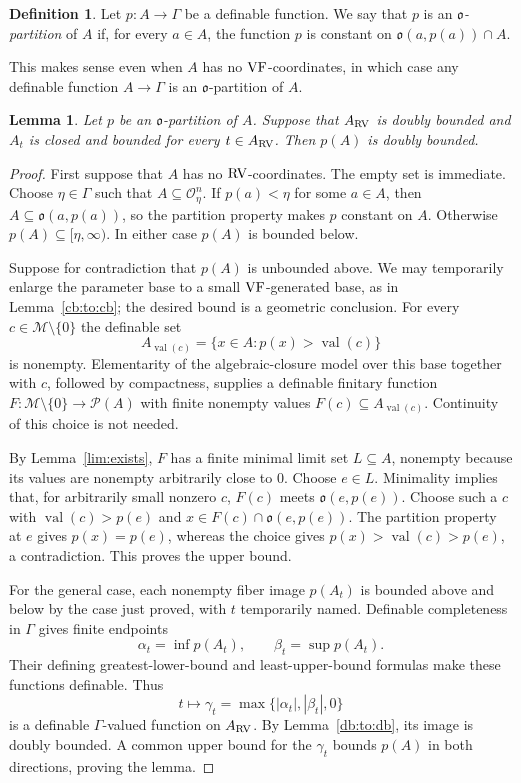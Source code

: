 \documentclass[12pt]{amsart}
\newcommand{\memph}[1]{{\color{magenta}\emph{#1}}}
\theoremstyle{plain}
\newtheorem{lem}[thm]{Lemma}
\theoremstyle{definition}
\newtheorem{defn}[thm]{Definition}
\theoremstyle{remark}
\numberwithin{equation}{section}
\theoremstyle{plain}
\newcommand{\VF}{\textup{VF}}
\newcommand{\RV}{\textup{RV}}
\newcommand{\MM}{\mdl M}
\newcommand{\OO}{\mdl O}
\newcommand{\go}{\mathfrak{o}}
\newcommand{\0}{\emptyset}
\newcommand{\mdl}[1]{\mathcal{#1}}  %
\newcommand{\fun}{\longrightarrow}
\newcommand{\efun}{\longmapsto}
\DeclareMathOperator{\vv}{val}
\begin{document}
\begin{defn}
Let $p : A \fun \Gamma$ be a definable function. We say that $p$ is an \memph{$\go$-partition} of $A$ if, for every $a \in A$, the function $p$ is constant on $\go(a, p(a)) \cap A$.
\end{defn}


This makes sense even when $A$ has no $\VF$-coordinates, in which case any definable function $A \fun \Gamma$ is an $\go$-partition of $A$.

\begin{lem}\label{vol:par:bounded}
Let $p$ be an $\go$-partition of $A$. Suppose that $A_{\RV}$ is doubly bounded and $A_t$ is closed and bounded for every $t \in A_{\RV}$. Then $p(A)$ is doubly bounded.
\end{lem}
\begin{proof}
First suppose that $A$ has no $\RV$-coordinates. The empty set is immediate. Choose $\eta\in\Gamma$ such that $A\subseteq\OO_\eta^n$. If $p(a)<\eta$ for some $a\in A$, then $A\subseteq\go(a,p(a))$, so the partition property makes $p$ constant on $A$. Otherwise $p(A)\subseteq[\eta,\infty)$. In either case $p(A)$ is bounded below.

Suppose for contradiction that $p(A)$ is unbounded above. We may temporarily enlarge the parameter base to a small $\VF$-generated base, as in Lemma~\ref{cb:to:cb}; the desired bound is a geometric conclusion. For every $c\in\MM\setminus\{0\}$ the definable set
\[
A_{\vv(c)}=\{x\in A:p(x)>\vv(c)\}
\]
is nonempty. Elementarity of the algebraic-closure model over this base together with $c$, followed by compactness, supplies a definable finitary function $F:\MM\setminus\{0\}\fun\mdl P(A)$ with finite nonempty values $F(c)\subseteq A_{\vv(c)}$. Continuity of this choice is not needed.

By Lemma~\ref{lim:exists}, $F$ has a finite minimal limit set $L\subseteq A$, nonempty because its values are nonempty arbitrarily close to $0$. Choose $e\in L$. Minimality implies that, for arbitrarily small nonzero $c$, $F(c)$ meets $\go(e,p(e))$. Choose such a $c$ with $\vv(c)>p(e)$ and $x\in F(c)\cap\go(e,p(e))$. The partition property at $e$ gives $p(x)=p(e)$, whereas the choice gives $p(x)>\vv(c)>p(e)$, a contradiction. This proves the upper bound.

For the general case, each nonempty fiber image $p(A_t)$ is bounded above and below by the case just proved, with $t$ temporarily named. Definable completeness in $\Gamma$ gives finite endpoints
\[
\alpha_t=\inf p(A_t),\qquad \beta_t=\sup p(A_t).
\]
Their defining greatest-lower-bound and least-upper-bound formulas make these functions definable. Thus
\[
t\efun\gamma_t=\max\{|\alpha_t|,|\beta_t|,0\}
\]
is a definable $\Gamma$-valued function on $A_{\RV}$. By Lemma~\ref{db:to:db}, its image is doubly bounded. A common upper bound for the $\gamma_t$ bounds $p(A)$ in both directions, proving the lemma.
\end{proof}
\end{document}
